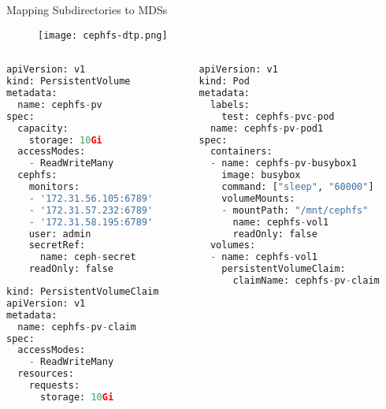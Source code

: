 \begin{frame}{Mapping Subdirectories to MDSs}
    \begin{figure}[htpb]
        \centering
        \texttt{[image: cephfs-dtp.png]}
    \end{figure}
\end{frame}

\begin{frame}[fragile]
\begin{columns}
    \begin{column}{0.4\textwidth}
\begin{lstlisting}[language=python]
apiVersion: v1
kind: PersistentVolume
metadata:
  name: cephfs-pv
spec:
  capacity:
    storage: 10Gi
  accessModes:
    - ReadWriteMany
  cephfs:
    monitors:
    - '172.31.56.105:6789'
    - '172.31.57.232:6789'
    - '172.31.58.195:6789'
    user: admin
    secretRef:
      name: ceph-secret
    readOnly: false
\end{lstlisting}

\begin{lstlisting}[language=python]
kind: PersistentVolumeClaim
apiVersion: v1
metadata:
  name: cephfs-pv-claim
spec:
  accessModes:
    - ReadWriteMany
  resources:
    requests:
      storage: 10Gi
\end{lstlisting}
    \end{column}
    \begin{column}{0.4\textwidth}
      
\begin{lstlisting}[language=python]
apiVersion: v1
kind: Pod
metadata:
  labels:
    test: cephfs-pvc-pod
  name: cephfs-pv-pod1
spec:
  containers:
  - name: cephfs-pv-busybox1
    image: busybox
    command: ["sleep", "60000"]
    volumeMounts:
    - mountPath: "/mnt/cephfs"
      name: cephfs-vol1
      readOnly: false
  volumes:
  - name: cephfs-vol1
    persistentVolumeClaim:
      claimName: cephfs-pv-claim
\end{lstlisting}
    \end{column}
\end{columns}
\end{frame}

